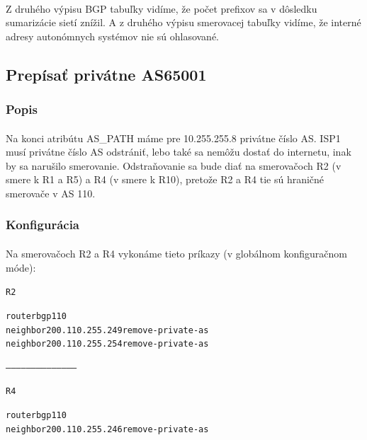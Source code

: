\documentclass[12pt,twoside,a4paper]{report}
\begin{document}
\paragraph{}
Z druhého výpisu BGP tabuľky vidíme, že počet prefixov sa v dôsledku sumarizácie sietí znížil. A z druhého výpisu smerovacej tabuľky vidíme, že interné adresy autonómnych systémov nie sú ohlasované.





\subsection{Prepísať privátne AS65001}
\subsubsection{Popis}
\paragraph{}
Na konci atribútu AS\_PATH máme pre 10.255.255.8 privátne číslo AS. ISP1 musí privátne číslo AS odstrániť, lebo také sa nemôžu dostať do internetu, inak by sa narušilo smerovanie. Odstraňovanie sa bude diať na smerovačoch R2 (v smere k R1 a R5) a R4 (v smere k R10), pretože R2 a R4 tie sú hraničné smerovače v AS 110.



\subsubsection{Konfigurácia}
\paragraph{}
Na smerovačoch R2 a R4 vykonáme tieto príkazy (v globálnom konfiguračnom móde):

\noindent
{\selectfont
\begin{small}
\begin{alltt}
R2

router bgp 110
neighbor 200.110.255.249 remove-private-as
neighbor 200.110.255.254 remove-private-as

------------------------------------------

R4

router bgp 110
neighbor 200.110.255.246 remove-private-as
\end{alltt}
\end{small}
}
\end{document}
